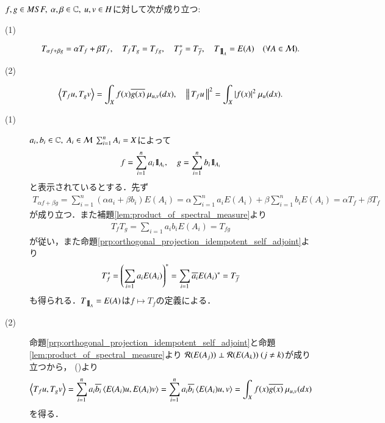 	\begin{screen}
		\begin{lem}
			$f,g \in MSF,\ \alpha,\beta \in \mathbb{C},\ u,v \in H$に対して次が成り立つ:
			\begin{description}
				\item[(1)] 
					\begin{align}
						T_{\alpha f + \beta g} = \alpha T_f + \beta T_f,
						\quad T_f T_g = T_{fg},
						\quad T_f^* = T_{\overline{f}},
						\quad T_{\mbox{1}\hspace{-0.25em}\mbox{l}_A} = E(A) \quad (\forall A \in \mathcal{M}).
					\end{align}
				
				\item[(2)] 
					\begin{align}
						\inprod<T_f u, T_g v> = \int_X f(x) \conj{g(x)}\ \mu_{u,v}(dx), 
						\quad \Norm{T_f u}{}^2 = \int_X |f(x)|^2\ \mu_u(dx).
					\end{align}
			\end{description}
			\label{lem:MSF_properties_of_T_f}
		\end{lem}
	\end{screen}
	
	\begin{prf}\mbox{}
		\begin{description}
			\item[(1)] $a_i,b_i \in \C,\ A_i \in \mathcal{M}\ \sum_{i=1}^{n} A_i = X$によって
				\begin{align}
					f = \sum_{i=1}^{n} a_i \mbox{1}\hspace{-0.25em}\mbox{l}_{A_i},
					\quad g = \sum_{i=1}^{n} b_i \mbox{1}\hspace{-0.25em}\mbox{l}_{A_i}
				\end{align}
				と表示されているとする．先ず
				\begin{align}
					T_{\alpha f + \beta g} = \sum_{i=1}^{n} (\alpha a_i + \beta b_i) E(A_i) = \alpha \sum_{i=1}^{n} a_i E(A_i) + \beta \sum_{i=1}^{n} b_i E(A_i) = \alpha T_f + \beta T_f
				\end{align}
				が成り立つ．また補題\ref{lem:product_of_spectral_measure}より
				\begin{align}
					T_f T_g = \sum_{i=1} a_i b_i E(A_i) = T_{fg}
				\end{align}
				が従い，また命題\ref{prp:orthogonal_projection_idempotent_self_adjoint}より
				\begin{align}
					T_f^* = \left( \sum_{i=1} a_i E(A_i) \right)^* = \sum_{i=1} \overline{a_i} E(A_i)^* = T_{\overline{f}}
				\end{align}
				も得られる．$T_{\mbox{1}\hspace{-0.25em}\mbox{l}_A} = E(A)$は$f \longmapsto T_f$の定義による．
			
			\item[(2)] 命題\ref{prp:orthogonal_projection_idempotent_self_adjoint}と命題\ref{lem:product_of_spectral_measure}より
				$\mathcal{R}( E(A_j) ) \perp \mathcal{R}( E(A_k) )\ (j \neq k)$が成り立つから，
				()より
				\begin{align}
					\inprod<T_f u, T_g v> 
					= \sum_{i=1}^{n} a_i \conj{b_i} \inprod<E(A_i) u, E(A_i) v> 
					= \sum_{i=1}^{n} a_i \conj{b_i} \inprod<E(A_i) u, v>
					= \int_X f(x) \conj{g(x)}\ \mu_{u,v}(dx)
				\end{align}
				を得る．
				\QED
		\end{description}
	\end{prf}
	
